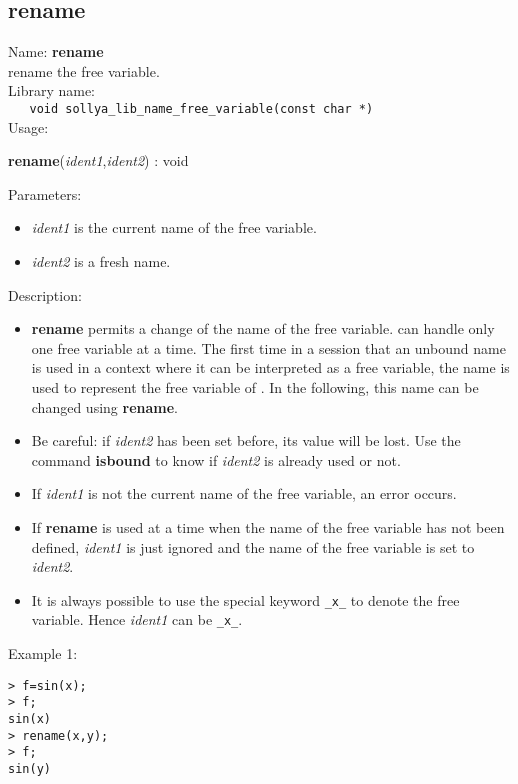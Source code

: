 \subsection{rename}
\label{labrename}
\noindent Name: \textbf{rename}\\
\phantom{aaa}rename the free variable.\\[0.2cm]
\noindent Library name:\\
\verb|   void sollya_lib_name_free_variable(const char *)|\\[0.2cm]
\noindent Usage: 
\begin{center}
\textbf{rename}(\emph{ident1},\emph{ident2}) : \textsf{void}\\
\end{center}
Parameters: 
\begin{itemize}
\item \emph{ident1} is the current name of the free variable.
\item \emph{ident2} is a fresh name.
\end{itemize}
\noindent Description: \begin{itemize}

\item \textbf{rename} permits a change of the name of the free variable. \sollya can handle
   only one free variable at a time. The first time in a session that an
   unbound name is used in a context where it can be interpreted as a free
   variable, the name is used to represent the free variable of \sollya. In the
   following, this name can be changed using \textbf{rename}.

\item Be careful: if \emph{ident2} has been set before, its value will be lost. Use
   the command \textbf{isbound} to know if \emph{ident2} is already used or not.

\item If \emph{ident1} is not the current name of the free variable, an error occurs.

\item If \textbf{rename} is used at a time when the name of the free variable has not been
   defined, \emph{ident1} is just ignored and the name of the free variable is set
   to \emph{ident2}.

\item It is always possible to use the special keyword \verb|_x_| to denote the free
   variable. Hence \emph{ident1} can be \verb|_x_|.
\end{itemize}
\noindent Example 1: 
\begin{center}\begin{minipage}{15cm}\begin{Verbatim}[frame=single,commandchars=\\\|\~]
> f=sin(x);
> f;
sin(x)
> rename(x,y);
> f;
sin(y)
\end{Verbatim}
\end{minipage}\end{center}

